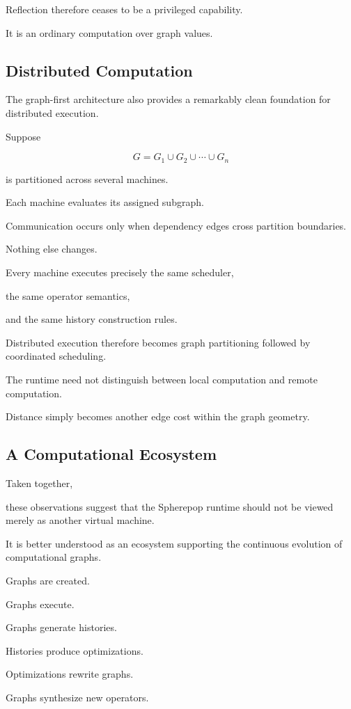 \documentclass[12pt,oneside]{article}
\begin{document}
Reflection therefore ceases to be a privileged capability.

It is an ordinary computation over graph values.

\subsection{Distributed Computation}

The graph-first architecture also provides a remarkably clean foundation for distributed execution.

Suppose

\[
G
=
G_1
\cup
G_2
\cup
\cdots
\cup
G_n
\]

is partitioned across several machines.

Each machine evaluates its assigned subgraph.

Communication occurs only when dependency edges cross partition boundaries.

Nothing else changes.

Every machine executes precisely the same scheduler,

the same operator semantics,

and the same history construction rules.

Distributed execution therefore becomes graph partitioning followed by coordinated scheduling.

The runtime need not distinguish between local computation and remote computation.

Distance simply becomes another edge cost within the graph geometry.

\subsection{A Computational Ecosystem}

Taken together,

these observations suggest that the Spherepop runtime should not be viewed merely as another virtual machine.

It is better understood as an ecosystem supporting the continuous evolution of computational graphs.

Graphs are created.

Graphs execute.

Graphs generate histories.

Histories produce optimizations.

Optimizations rewrite graphs.

Graphs synthesize new operators.
\end{document}
